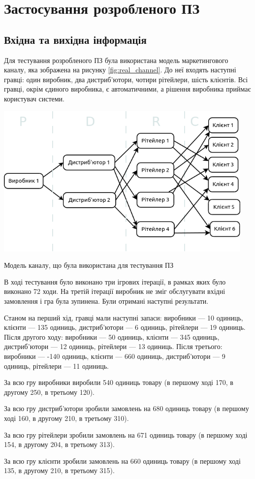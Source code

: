 \section{Застосування розробленого ПЗ}
\subsection{Вхідна та вихідна інформація}

Для тестування розробленого ПЗ була використана модель маркетингового каналу, яка зображена на рисунку \ref{fig:real_channel}. До неї входять наступні гравці: один виробник, два дистриб’ютори, чотири рітейлери, шість клієнтів. Всі гравці, окрім єдиного виробника, є автоматичними, а рішення виробника приймає користувач системи.

\begin{stdfigure}
    \includegraphics[width=5in]{images/real_channel.png}
    \caption{Модель каналу, що була використана для тестування ПЗ}
    \label{fig:real_channel}
\end{stdfigure}

В ході тестування було виконано три ігрових ітерації, в рамках яких було виконано 72 ходи. На третій ітерації виробник не зміг обслугувати вхідні замовлення і гра була зупинена. Були отримані наступні результати.
\begin{longEnumerate}
\item Станом на перший хід, гравці мали наступні запаси: виробники --- 10 одиниць, клієнти --- 135 одиниць, дистриб’ютори --- 6 одиниць, рітейлери --- 19 одиниць. Після другого ходу: виробники --- 50 одиниць, клієнти --- 345 одиниць, дистриб’ютори --- 12 одиниць, рітейлери --- 13 одиниць. Після третього: виробники --- -140 одиниць, клієнти --- 660 одиниць, дистриб’ютори --- 9 одиниць, рітейлери --- 11 одиниць.
\item За всю гру виробники виробили 540 одиниць товару (в першому ході 170, в другому 250, в третьому 120).
\item За всю гру дистриб’ютори зробили замовлень на 680 одиниць товару (в першому ході 160, в другому 210, в третьому 310).
\item За всю гру рітейлери зробили замовлень на 671 одиниць товару (в першому ході 154, в другому 204, в третьому 313).
\item За всю гру клієнти зробили замовлень на 660 одиниць товару (в першому ході 135, в другому 210, в третьому 315).
\end{longEnumerate}

